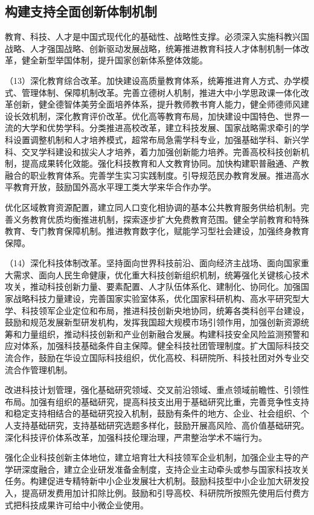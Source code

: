     \subsection{构建支持全面创新体制机制}

    教育、科技、人才是中国式现代化的基础性、战略性支撑。必须深入实施科教兴国战略、人才强国战略、创新驱动发展战略，统筹推进教育科技人才体制机制一体改革，健全新型举国体制，提升国家创新体系整体效能。

    （13）深化教育综合改革。加快建设高质量教育体系，统筹推进育人方式、办学模式、管理体制、保障机制改革。完善立德树人机制，推进大中小学思政课一体化改革创新，健全德智体美劳全面培养体系，提升教师教书育人能力，健全师德师风建设长效机制，深化教育评价改革。优化高等教育布局，加快建设中国特色、世界一流的大学和优势学科。分类推进高校改革，建立科技发展、国家战略需求牵引的学科设置调整机制和人才培养模式，超常布局急需学科专业，加强基础学科、新兴学科、交叉学科建设和拔尖人才培养，着力加强创新能力培养。完善高校科技创新机制，提高成果转化效能。强化科技教育和人文教育协同。加快构建职普融通、产教融合的职业教育体系。完善学生实习实践制度。引导规范民办教育发展。推进高水平教育开放，鼓励国外高水平理工类大学来华合作办学。

    优化区域教育资源配置，建立同人口变化相协调的基本公共教育服务供给机制。完善义务教育优质均衡推进机制，探索逐步扩大免费教育范围。健全学前教育和特殊教育、专门教育保障机制。推进教育数字化，赋能学习型社会建设，加强终身教育保障。

    （14）深化科技体制改革。坚持面向世界科技前沿、面向经济主战场、面向国家重大需求、面向人民生命健康，优化重大科技创新组织机制，统筹强化关键核心技术攻关，推动科技创新力量、要素配置、人才队伍体系化、建制化、协同化。加强国家战略科技力量建设，完善国家实验室体系，优化国家科研机构、高水平研究型大学、科技领军企业定位和布局，推进科技创新央地协同，统筹各类科创平台建设，鼓励和规范发展新型研发机构，发挥我国超大规模市场引领作用，加强创新资源统筹和力量组织，推动科技创新和产业创新融合发展。构建科技安全风险监测预警和应对体系，加强科技基础条件自主保障。健全科技社团管理制度。扩大国际科技交流合作，鼓励在华设立国际科技组织，优化高校、科研院所、科技社团对外专业交流合作管理机制。

    改进科技计划管理，强化基础研究领域、交叉前沿领域、重点领域前瞻性、引领性布局。加强有组织的基础研究，提高科技支出用于基础研究比重，完善竞争性支持和稳定支持相结合的基础研究投入机制，鼓励有条件的地方、企业、社会组织、个人支持基础研究，支持基础研究选题多样化，鼓励开展高风险、高价值基础研究。深化科技评价体系改革，加强科技伦理治理，严肃整治学术不端行为。

    强化企业科技创新主体地位，建立培育壮大科技领军企业机制，加强企业主导的产学研深度融合，建立企业研发准备金制度，支持企业主动牵头或参与国家科技攻关任务。构建促进专精特新中小企业发展壮大机制。鼓励科技型中小企业加大研发投入，提高研发费用加计扣除比例。鼓励和引导高校、科研院所按照先使用后付费方式把科技成果许可给中小微企业使用。


